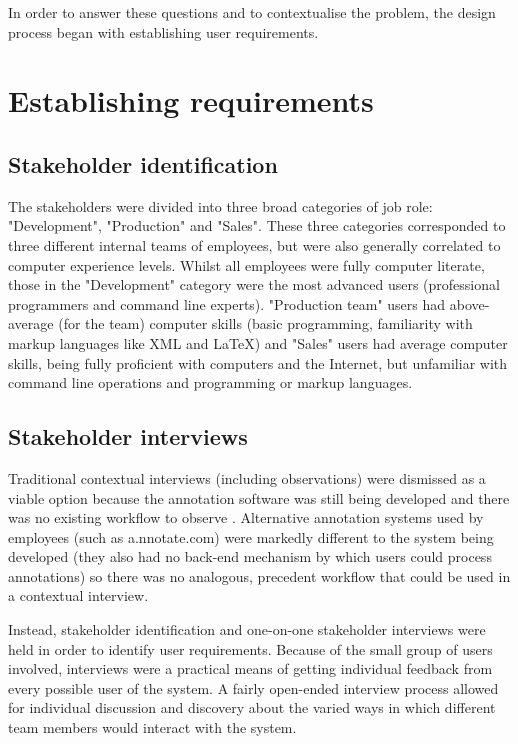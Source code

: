 In order to answer these questions and to contextualise the problem, the design process began with establishing user requirements. 
\section{Establishing requirements}
 

\subsection{Stakeholder identification}
The stakeholders were divided into three broad categories of job role: "Development", "Production" and "Sales". These three categories corresponded to three different internal teams of employees, but were also generally correlated to computer experience levels. Whilst all employees were fully computer literate, those in the "Development" category were the most advanced users (professional programmers and command line experts). "Production team" users had above-average (for the team) computer skills (basic programming, familiarity with markup languages like XML and LaTeX) and "Sales" users had average computer skills, being fully proficient with computers and the Internet,  but unfamiliar with command line operations and programming or markup languages.

\subsection{Stakeholder interviews}
Traditional contextual interviews (including observations) were dismissed as a viable option because the annotation software was still being developed and there was no existing workflow to observe \citep[p. 38]{BeyerHoltzblatt}. Alternative annotation systems used by employees (such as a.nnotate.com) were markedly different to the system being developed (they also had no back-end mechanism by which users could process annotations) so there was no analogous, precedent workflow that could be used in a contextual interview. 

Instead, stakeholder identification and one-on-one stakeholder interviews were held in order to identify user requirements. Because of the small group of users involved, interviews were a practical means of getting individual feedback from every possible user of the system. A fairly open-ended interview process allowed for individual discussion and discovery about the varied ways in which different team members would interact with the system. 

